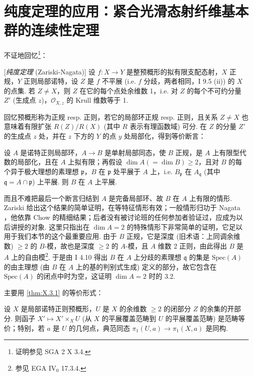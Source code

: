\section{纯度定理的应用：紧合光滑态射纤维基本群的连续性定理}

不证地回忆\footnote{证明参见 SGA 2 X 3.4.}：

\begin{theorem}\label{thm:X.3.1}
[\emph{纯度定理} (Zariski-Nagata)] 设 $f \colon X \to Y$ 是整预概形的拟有限支配态射，$X$ 正规，$Y$ 正则局部诺特，设 $Z$ 是 $f$ 不平展 (i.e. $f$ 分歧，两者相同，I 9.5 (ii)) 的 $X$ 的点集. 若 $Z \neq X$，则 $Z$ 在它的每个点处余维数 1，i.e. 对 $Z$ 的每个不可约分量 $Z'$ (生成点 $z$)，$\mathcal{O}_{X,z}$ 的 Krull 维数等于 1.
\end{theorem}

回忆预概形称为正规 resp. 正则，若它的局部环正规 resp. 正则，且关系 $Z \neq X$ 也意味着有限扩张 $R(Z)/R(X)$ (其中 $R$ 表示有理函数域) 可分. 在 $Z$ 的分量 $Z'$ 的生成点 $z$ 处，并在 $z$ 下方的 $Y$ 的点 $y$ 处局部化，得到等价断言：

\begin{corollary}\label{cor:X.3.2}
设 $A$ 是诺特正则局部环，$A \to B$ 是单射局部同态，使 $B$ 正规，是 $A$ 上有限型代数的局部化，且在 $A$ 上拟有限；再假设 $\dim A (= \dim B) \geqslant 2$，且对 $B$ 的每个异于极大理想的素理想 $\mathfrak{p}$，$B$ 在 $\mathfrak{p}$ 处平展于 $A$ 上，i.e. $B_{\mathfrak{p}}$ 在 $A_{\mathfrak{q}}$ (其中 $\mathfrak{q} = A \cap \mathfrak{p}$) 上平展. 则 $B$ 在 $A$ 上平展.
\end{corollary}

而且不难把最后一个断言归结到 $A$ 是完备局部环、故 $B$ 在 $A$ 上有限的情形. Zariski \cite{exp10-5} 给出这个结果的简单证明，在等特征情形有效；一般情形归功于 Nagata \cite{exp10-3}，他依靠 Chow 的精细结果；后者没有被讨论班的任何参加者验证过，应成为以后讲授的对象. 这里只指出在 $\dim A = 2$ 的特殊情形下非常简单的证明，它足以用于我们本节的这个最重要应用. 由于 $B$ 正规，它是深度 (旧术语：上同调余维数) $\geqslant 2$ 的 $B$-模，故也是深度 $\geqslant 2$ 的 $A$-模，且 $A$ 维数 2 正则，由此得出 $B$ 是 $A$ 上的自由模\footnote{参见 EGA IV$_0$ 17.3.4.}. 于是由 I 4.10 得出 $B$ 在 $A$ 上分歧的素理想 $\mathfrak{q}$ 的集是 $\mathrm{Spec}(A)$ 的由主理想 (由 $B$ 在 $A$ 上的基的判别式生成) 定义的部分，故它包含在 $\mathrm{Spec}(A)$ 的闭点中时为空，这证明 $\dim A = 2$ 时的 3.2.

主要用 \ref{thm:X.3.1} 的等价形式：

\begin{corollary}\label{cor:X.3.3}
设 $X$ 是局部诺特正则预概形，$U$ 是 $X$ 的余维数 $\geqslant 2$ 的闭部分 $Z$ 的余集的开部分. 则函子 $X' \mapsto X' \times_X U$ (从 $X$ 的平展覆盖范畴到 $U$ 的平展覆盖范畴) 是范畴等价；特别，若 $a$ 是 $U$ 的几何点，典范同态 $\pi_1(U, a) \to \pi_1(X, a)$ 是同构.
\end{corollary}


